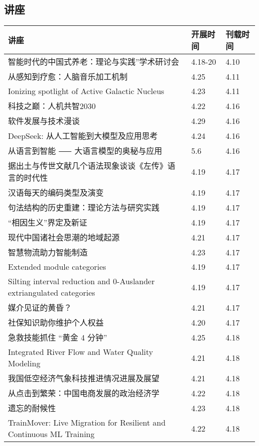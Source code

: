 \documentclass[letterpaper, 12pt]{article}
\begin{document}
\begin{multicols}{2}
\pagebreak

\section{讲座}
\begin{tabular}{|>{\centering\arraybackslash}m{}|m{}|m{}|}
    \hline
    讲座 & 开展时间 & 刊载时间\\
    \hline\hline
    智能时代的中国式养老：理论与实践”学术研讨会 & 4.18-20 & 4.10\\\hline
    从感知到疗愈：人脑音乐加工机制 & 4.25 & 4.11\\\hline
    Ionizing spotlight of Active Galactic Nucleus & 4.23 & 4.11\\\hline
    科技之巅：人机共智2030 & 4.22 & 4.16\\\hline
    软件发展与技术漫谈 & 4.29 & 4.16\\\hline
    DeepSeek: 从人工智能到大模型及应用思考 & 4.24 & 4.16\\\hline
    从语言到智能 ⸺ 大语言模型的奥秘与应用 & 5.6 & 4.16\\\hline
    据出土与传世文献几个语法现象谈谈《左传》语言的时代性 & 4.19 & 4.17\\\hline
    汉语{每天}的编码类型及演变 & 4.19 & 4.17\\\hline
    句法结构的历史重建：理论方法与研究实践 & 4.19 & 4.17\\\hline
    “相因生义”界定及新证 & 4.19 & 4.17\\\hline
    现代中国诸社会思潮的地域起源 & 4.21 & 4.17\\\hline
    智慧物流助力智能制造 & 4.23 & 4.17\\\hline
    Extended module categories & 4.19 & 4.17\\\hline
    Silting interval reduction and 0-Auslander extriangulated categories & 4.19 & 4.17\\\hline
    媒介见证的黄昏？ & 4.21 & 4.17\\\hline
    社保知识助你维护个人权益 & 4.20 & 4.17\\\hline
    急救技能抓住 “黄金 4 分钟” & 4.25 & 4.18\\\hline
    Integrated River Flow and Water Quality Modeling & 4.21 & 4.18\\\hline
    我国低空经济气象科技推进情况进展及展望 & 4.21 & 4.18\\\hline
    从点击到繁荣：中国电商发展的政治经济学 & 4.22 & 4.18\\\hline
    遗忘的耐候性 & 4.23 & 4.18\\\hline
    TrainMover: Live Migration for Resilient and Continuous ML Training & 4.22 & 4.18\\\hline
\end{tabular}


\end{multicols}
\end{document}
